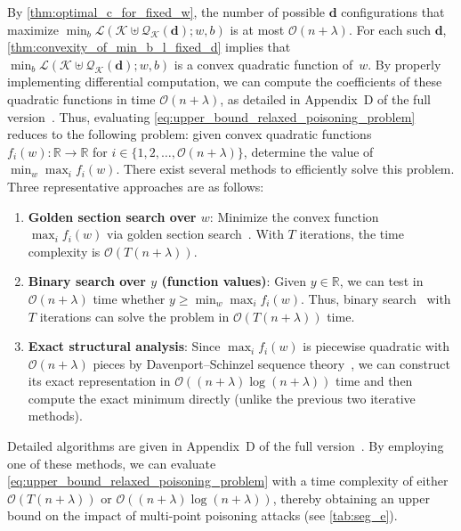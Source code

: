 \documentclass[acmsmall]{acmart}
\begin{document}
By \cref{thm:optimal_c_for_fixed_w}, the number of possible $\bm{d}$ configurations that maximize $\min_{b} \mathcal{L}(\mathcal{K} \uplus \mathcal{Q}_\mathcal{K}(\bm{d}); w, b)$ is at most $\mathcal{O}(n + \lambda)$.
For each such $\bm{d}$, \cref{thm:convexity_of_min_b_l_fixed_d} implies that $\min_{b} \mathcal{L}(\mathcal{K} \uplus \mathcal{Q}_\mathcal{K}(\bm{d}); w, b)$ is a convex quadratic function of~$w$.
By properly implementing differential computation, we can compute the coefficients of these quadratic functions in time $\mathcal{O}(n + \lambda)$, as detailed in Appendix~D of the full version~\cite{sato2026mathematical_arxiv}.
Thus, evaluating \cref{eq:upper_bound_relaxed_poisoning_problem} reduces to the following problem: given convex quadratic functions $f_i(w): \mathbb{R} \to \mathbb{R}$ for $i \in \{1,2,\dots,\mathcal{O}(n + \lambda)\}$, determine the value of $\min_w \max_i f_i(w)$.
There exist several methods to efficiently solve this problem.
Three representative approaches are as follows:
\begin{enumerate}[leftmargin=1.5em]
    \item \textbf{Golden section search over $w$}: Minimize the convex function $\max_i f_i(w)$ via golden section search~\citep{press2007numerical}. With $T$ iterations, the time complexity is $\mathcal{O}(T(n+\lambda))$.
    \item \textbf{Binary search over $y$ (function values)}: Given $y\in\mathbb{R}$, we can test in $\mathcal{O}(n+\lambda)$ time whether $y \ge \min_w \max_i f_i(w)$. Thus, binary search~\citep{cormen2009introduction} with $T$ iterations can solve the problem in $\mathcal{O}(T(n + \lambda))$ time.
    \item \textbf{Exact structural analysis}: Since $\max_i f_i(w)$ is piecewise quadratic with $\mathcal{O}(n+\lambda)$ pieces by Davenport--Schinzel sequence theory~\citep{sharir1988davenport}, we can construct its exact representation in $\mathcal{O}((n+\lambda)\log(n+\lambda))$ time and then compute the exact minimum directly (unlike the previous two iterative methods).
\end{enumerate}
Detailed algorithms are given in Appendix~D of the full version~\cite{sato2026mathematical_arxiv}.
By employing one of these methods, we can evaluate \cref{eq:upper_bound_relaxed_poisoning_problem} with a time complexity of either $\mathcal{O}(T(n + \lambda))$ or $\mathcal{O}((n + \lambda)\log(n + \lambda))$, thereby obtaining an upper bound on the impact of multi-point poisoning attacks (see \cref{tab:seg_e}).
\end{document}
